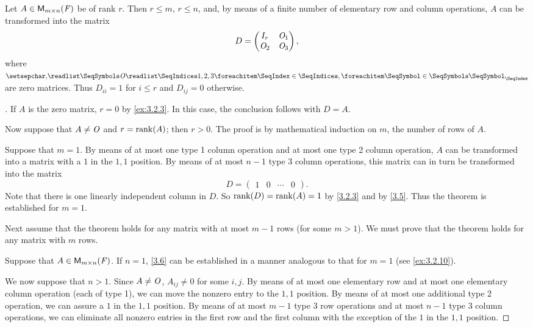\begin{thm}\label{3.6}
	Let \(A \in \MS\) be of rank \(r\).
	Then \(r \leq m\), \(r \leq n\), and, by means of a finite number of elementary row and column operations, \(A\) can be transformed into the matrix
	\[
		D = \begin{pmatrix}
			I_r   & \mathit{O}_1 \\
			\mathit{O}_2 & \mathit{O}_3
		\end{pmatrix},
	\]
	where \(\seq{\zm}{1,2,3}\) are zero matrices.
	Thus \(D_{i i} = 1\) for \(i \leq r\) and \(D_{i j} = 0\) otherwise.
\end{thm}

\begin{proof}[]
	If \(A\) is the zero matrix, \(r = 0\) by \cref{ex:3.2.3}.
	In this case, the conclusion follows with \(D = A\).

	Now suppose that \(A \neq \mathit{O}\) and \(r = \rk{A}\);
	then \(r > 0\).
	The proof is by mathematical induction on \(m\), the number of rows of \(A\).

	Suppose that \(m = 1\).
	By means of at most one type 1 column operation and at most one type 2 column operation, \(A\) can be transformed into a matrix with a \(1\) in the \(1,1\) position.
	By means of at most \(n - 1\) type 3 column operations, this matrix can in turn be transformed into the matrix
	\[
		D = \begin{pmatrix}
			1 & 0 & \cdots & 0
		\end{pmatrix}.
	\]
	Note that there is one linearly independent column in \(D\).
	So \(\rk{D} = \rk{A} = 1\) by \cref{3.2.3} and by \cref{3.5}.
	Thus the theorem is established for \(m = 1\).

	Next assume that the theorem holds for any matrix with at most \(m - 1\) rows (for some \(m > 1\)).
	We must prove that the theorem holds for any matrix with \(m\) rows.

	Suppose that \(A \in \MS\).
	If \(n = 1\), \cref{3.6} can be established in a manner analogous to that for \(m = 1\)
	(see \cref{ex:3.2.10}).

	We now suppose that \(n > 1\).
	Since \(A \neq \mathit{O}\), \(A_{i j} \neq 0\) for some \(i, j\).
	By means of at most one elementary row and at most one elementary column operation (each of type 1), we can move the nonzero entry to the \(1,1\) position.
	By means of at most one additional type 2 operation, we can assure a \(1\) in the \(1,1\) position.
	By means of at most \(m - 1\) type 3 row operations and at most \(n - 1\) type 3 column operations, we can eliminate all nonzero entries in the first row and the first column with the exception of the \(1\) in the \(1,1\) position.


\end{proof}
